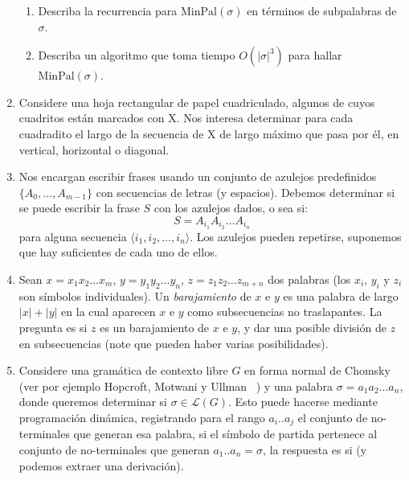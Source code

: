 \begin{enumerate}
\begin{enumerate}
    \item
      Describa la recurrencia para \(\mathrm{MinPal}(\sigma)\)
      en términos de subpalabras de \(\sigma\).
    \item
      Describa un algoritmo que toma tiempo \(O(\lvert \sigma \rvert^3)\)
      para hallar \(\mathrm{MinPal}(\sigma)\).
    \end{enumerate}
  \item
    Considere una hoja rectangular de papel cuadriculado,
    algunos de cuyos cuadritos están marcados con X.
    Nos interesa determinar para cada cuadradito
    el largo de la secuencia de X de largo máximo que pasa por él,
    en vertical, horizontal o diagonal.
  \item
    Nos encargan escribir frases
    usando un conjunto de azulejos predefinidos
    \(\{A_0, \dotsc, A_{m - 1}\}\) con secuencias de letras
    (y espacios).
    Debemos determinar si se puede escribir la frase \(S\)
    con los azulejos dados,
    o sea si:
    \begin{equation*}
      S
	= A_{i_1} A_{i_2} \ldots A_{i_n}
    \end{equation*}
    para alguna secuencia \(\langle i_1, i_2, \dotsc, i_n \rangle\).
    Los azulejos pueden repetirse,
    suponemos que hay suficientes de cada uno de ellos.
  \item
    Sean \(x = x_1 x_2 \ldots x_m\),
    \(y = y_1 y_2 \ldots y_n\),
    \(z = z_1 z_2 \ldots z_{m + n}\)
    dos palabras
    (los \(x_i\), \(y_i\) y \(z_i\) son símbolos individuales).
    Un \emph{barajamiento} de \(x\) e \(y\)
    es una palabra de largo \(\lvert x \rvert + \lvert y \rvert\)
    en la cual aparecen \(x\) e \(y\) como subsecuencias no traslapantes.
    La pregunta es si \(z\) es un barajamiento de \(x\) e \(y\),
    y dar una posible división de \(z\) en subsecuencias
    (note que pueden haber varias posibilidades).
  \item
    Considere una gramática de contexto libre \(G\)
    en forma normal de Chomsky
    (ver por ejemplo Hopcroft, Motwani y Ullman~%
      \cite[capítulo~7]{hopcroft07:_introd_autom_theor_languag_comput})
    y una palabra \(\sigma = a_1 a_2 \ldots a_n\),
    donde queremos determinar si \(\sigma \in \mathscr{L}(G)\).
    Esto puede hacerse mediante programación dinámica,
    registrando para el rango \(a_i .. a_j\) el conjunto de no-terminales
    que generan esa palabra,
    si el símbolo de partida pertenece al conjunto de no-terminales
    que generan \(a_1 .. a_n = \sigma\),
    la respuesta es si
    (y podemos extraer una derivación).

\end{enumerate}
